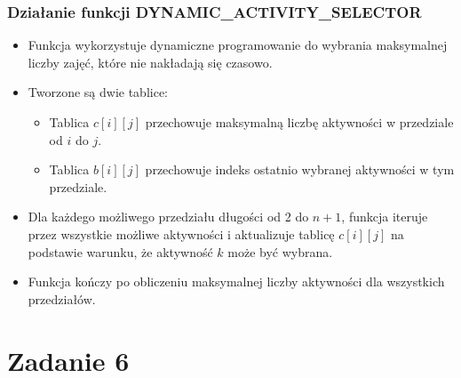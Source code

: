 \documentclass{article}
\begin{document}
		\subsubsection*{Działanie funkcji DYNAMIC\_ACTIVITY\_SELECTOR}
		\begin{itemize}
			\item Funkcja wykorzystuje dynamiczne programowanie do wybrania maksymalnej liczby zajęć, które nie nakładają się czasowo.
			\item Tworzone są dwie tablice: 
			\begin{itemize}
				\item Tablica $c[i][j]$ przechowuje maksymalną liczbę aktywności w przedziale od $i$ do $j$.
				\item Tablica $b[i][j]$ przechowuje indeks ostatnio wybranej aktywności w tym przedziale.
			\end{itemize}
			\item Dla każdego możliwego przedziału długości od 2 do $n+1$, funkcja iteruje przez wszystkie możliwe aktywności i aktualizuje tablicę $c[i][j]$ na podstawie warunku, że aktywność $k$ może być wybrana.
			\item Funkcja kończy po obliczeniu maksymalnej liczby aktywności dla wszystkich przedziałów.
		\end{itemize}
	\newpage
	\section*{Zadanie 6}
	
\end{document}
